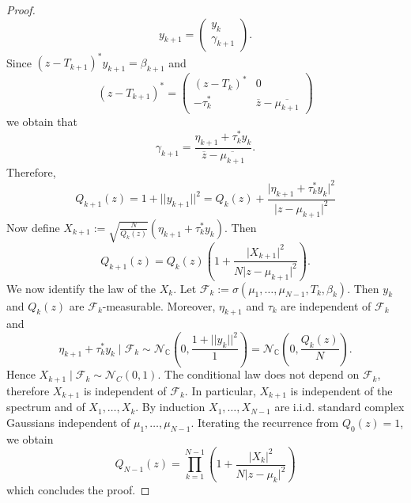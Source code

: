\documentclass[12pt,a4paper]{amsart}
\theoremstyle{plain} %
\newcommand{\C}{\mathbb{C}}
\begin{document}
\begin{proof}
\begin{equation*}
        y_{k+1}=\begin{pmatrix}
        y_k\\
        \gamma_{k+1}
    \end{pmatrix}.
    \end{equation*}
    Since $(z-T_{k+1})^*y_{k+1}=\beta_{k+1}$ and 
    \begin{equation*}
        (z-T_{k+1})^*= \begin{pmatrix}
        (z-T_k)^*&0\\
        -\tau_k^*& \overline{z}-\overline{\mu_{k+1}}
    \end{pmatrix}
    \end{equation*}
    we obtain that 
    \begin{equation*}
        \gamma_{k+1}=\frac{\eta_{k+1}+\tau_k^*y_k}{\overline{z}-\overline{\mu_{k+1}}}.
    \end{equation*}
    Therefore, 
    \begin{equation*}
        Q_{k+1}(z)=1+\lvert \lvert y_{k+1}\lvert \lvert^2=Q_k(z)+ \frac{\lvert \eta_{k+1}+\tau_k^*y_k\lvert^2}{\lvert z-\mu_{k+1}\lvert^2}
    \end{equation*}
    Now define $X_{k+1}:=\sqrt{\frac{N}{Q_k(z)}}(\eta_{k+1}+\tau_k^*y_k).$ Then 
    \begin{equation*}
        Q_{k+1}(z)=Q_k(z)\left(1+ \frac{\lvert X_{k+1}\lvert^2}{N\lvert z-\mu_{k+1}\lvert^2}\right).
    \end{equation*}
    We now identify the law of the $X_k$. Let $\mathcal{F}_k:=\sigma(\mu_1,\ldots,\mu_{N-1},T_k,\beta_k).$ Then $y_k$ and $Q_k(z)$ are $\mathcal{F}_k$-measurable. Moreover, $\eta_{k+1}$ and $\tau_k$ are independent of $\mathcal{F}_k$ and 
    \begin{equation*}
        \eta_{k+1}+\tau_k^*y_k \mid \mathcal{F}_k \sim \mathcal{N}_{\C}\left(0,\frac{1+\lvert \lvert y_k \lvert \lvert^2}{1}\right)=\mathcal{N}_{\C}\left(0,\frac{Q_k(z)}{N}\right).
    \end{equation*}
    Hence $X_{k+1}\mid \mathcal{F}_k \sim \mathcal{N}_{C}(0,1).$ The conditional law does not depend on $\mathcal{F}_k$, therefore $X_{k+1}$ is independent of $\mathcal{F}_k$. In particular, $X_{k+1}$ is independent of the spectrum and of $X_1,\ldots,X_k$. By induction $X_1,\ldots,X_{N-1}$ are i.i.d. standard complex Gaussians independent of $\mu_1,\ldots,\mu_{N-1}$. Iterating the recurrence from $Q_0(z)=1$, we obtain 
    \begin{equation*}
        Q_{N-1}(z)=\prod_{k=1}^{N-1}\left(1+\frac{\lvert X_k \lvert ^2}{N\lvert z-\mu_k \lvert^2}\right)
    \end{equation*}
    which concludes the proof.
\end{proof}
\end{document}

